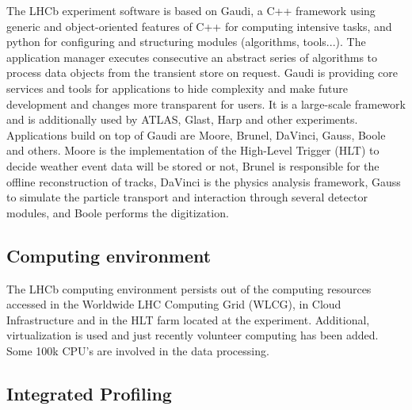 \documentclass[a4paper]{jpconf}
\begin{document}
The LHCb experiment software is based on Gaudi\cite{gaudi}, a C++ framework using generic and object-oriented features of C++ for computing intensive tasks, and python for configuring and structuring modules (algorithms, tools...). The application manager executes consecutive an abstract series of algorithms to process data objects from the transient store on request. Gaudi is providing core services and tools for applications to hide complexity and make future development and changes more transparent for users. It is a large-scale framework and is additionally used by ATLAS, Glast, Harp and other experiments.
\newline
Applications build on top of Gaudi are Moore, Brunel, DaVinci, Gauss, Boole and others. Moore is the implementation of the High-Level Trigger (HLT) to decide weather event data will be stored or not, Brunel is responsible for the offline reconstruction of tracks, DaVinci is the physics analysis framework, Gauss to simulate the particle transport and interaction through several detector modules, and Boole performs the digitization.

\subsection{Computing environment}
\label{sec:computing_environment}

The LHCb computing environment persists out of the computing resources accessed in the Worldwide LHC Computing Grid (WLCG), in Cloud Infrastructure and in the HLT farm located at the experiment. Additional, virtualization is used and just recently volunteer computing has been added. Some 100k CPU's are involved in the data processing. 

\subsection{Integrated Profiling}
\label{sec:integrated_profiling}
\end{document}
